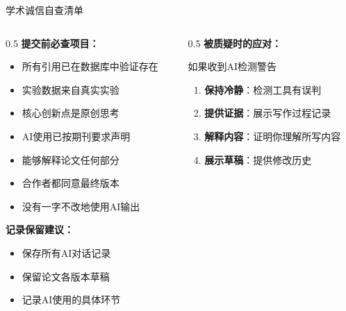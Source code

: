 \documentclass[aspectratio=169,11pt]{beamer}
\begin{document}
\begin{frame}{学术诚信自查清单}
    \begin{columns}
        \begin{column}{0.5\textwidth}
            \textbf{提交前必查项目：}
            \begin{itemize}
                \item[$\square$] 所有引用已在数据库中验证存在
                \item[$\square$] 实验数据来自真实实验
                \item[$\square$] 核心创新点是原创思考
                \item[$\square$] AI使用已按期刊要求声明
                \item[$\square$] 能够解释论文任何部分
                \item[$\square$] 合作者都同意最终版本
                \item[$\square$] 没有一字不改地使用AI输出
            \end{itemize}
            
            \vspace{0.3cm}
            \textbf{记录保留建议：}
            \begin{itemize}
                \item 保存所有AI对话记录
                \item 保留论文各版本草稿
                \item 记录AI使用的具体环节
            \end{itemize}
        \end{column}
        \begin{column}{0.5\textwidth}
            \textbf{被质疑时的应对：}
            \begin{block}{如果收到AI检测警告}
                \small
                \begin{enumerate}
                    \item \textbf{保持冷静}：检测工具有误判
                    \item \textbf{提供证据}：展示写作过程记录
                    \item \textbf{解释内容}：证明你理解所写内容
                    \item \textbf{展示草稿}：提供修改历史
                \end{enumerate}
            \end{block}
            

\end{column}
\end{columns}
\end{frame}
\end{document}
